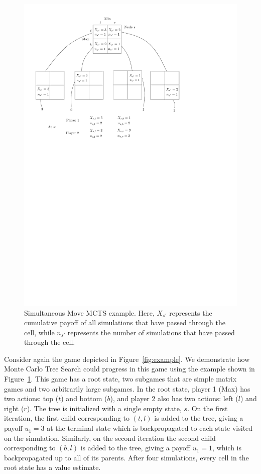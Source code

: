 \begin{figure}[t]
\centering
\includegraphics[scale=0.7]{figures/smmcts-example}
\caption{Simultaneous Move MCTS example.
Here, $X_{s'}$ represents the cumulative payoff of all simulations that have passed
through the cell, while $n_{s'}$ represents the number of simulations that have passed through the cell.}
\label{fig:smmcts-example}
\end{figure}

Consider again the game depicted in Figure~\ref{fig:example}. We demonstrate how Monte Carlo Tree Search
could progress in this game using the example shown in Figure~\ref{fig:smmcts-example}. This game has a root state,
two subgames that are simple matrix games and two arbitrarily large subgames. In the root state, player 1 (Max) has two
actions: top ($t$) and bottom ($b$), and player 2 also has two actions: left ($l$) and right ($r$). The tree is initialized
with a single empty state, $s$. On the first iteration, the first child corresponding to $(t,l)$ is added to the tree,
giving a payoff $u_1 = 3$ at the terminal state which is backpropagated to each state visited on the simulation.
Similarly, on the second iteration the second child corresponding to $(b,l)$ is added to the tree, giving a payoff $u_1 = 1$, which is
backpropagated up to all of its parents.
After four simulations, every cell in the root state has a value estimate.

